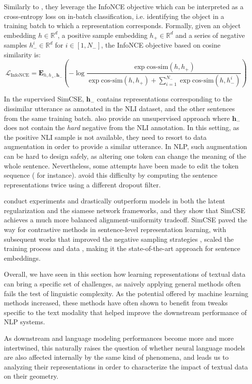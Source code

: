 Similarly to \citet{simclr}, they leverage the InfoNCE objective \citep{oord2019representationlearningcontrastivepredictive} which can be interpreted as a cross-entropy loss on in-batch classification, i.e. identifying the object in a training batch to which a representation corresponds. Formally, given an object embedding $h \in \mathbb{R}^d$, a positive sample embedding $h_+ \in \mathbb{R}^d$ and a series of negative samples $h^i_- \in \mathbb{R}^d$ for $i \in [1, N_-]$, the InfoNCE objective based on cosine similarity is:
$$
\mathcal{L}_{\text{InfoNCE}} = \mathbf{E}_{h, h_+, \mathbf{h}_-}\left(-\log \frac{\exp \text{cos-sim}(h, h_+)}{\exp \text{cos-sim}(h, h_+) + \sum_{i=1}^{N_-} \exp \text{cos-sim}(h, h^i_-)}\right)
$$

In the supervised SimCSE, $\mathbf{h}_-$ contains representations corresponding to the dissimilar utterance as annotated in the NLI dataset, and the other sentences from the same training batch. \citet{gao-etal-2021-simcse} also provide an unsupervised approach where $\mathbf{h}_-$ does not contain the \textit{hard} negative from the NLI annotation. In this setting, as the positive NLI sample is not available, they need to resort to data augmentation in order to provide a similar utterance. In NLP, such augmentation can be hard to design safely, as altering one token can change the meaning of the whole sentence. Nevertheless, some attempts have been made to edit the token sequence (\citet{10.1145/3593590} for instance). \citet{gao-etal-2021-simcse} avoid this difficulty by computing the sentence representations twice using a different dropout filter.

\citet{gao-etal-2021-simcse} conduct experiments and drastically outperform models in both the latent regularization and the siamese network frameworks, and they show that SimCSE achieves a much more balanced alignment-uniformity tradeoff. SimCSE paved the way for contrastive methods in sentence-level representation learning, with subsequent works that improved the negative sampling strategies \citep{yan-etal-2021-consert}, scaled the training process and data \citep{li2023generaltextembeddingsmultistage}, making it the state-of-the-art approach for sentence embeddings.

\vspace{2em}

Overall, we have seen in this section how learning representations of textual data can bring a specific set of challenges, as naively applying general methods often fails the test of linguistic complexity. As the potential offered by machine learning methods increased, these methods have often shown to benefit from tweaks specific to the text modality that helped improve the downstream performance of NLP systems.

As downstream and language modeling performances become more and more intertwined, this naturally raises the question of whether neural language models are also affected internally by the same kind of phenomena, and leads us to analyzing their representations in order to characterize the impact of textual data on their geometry.

\newpage